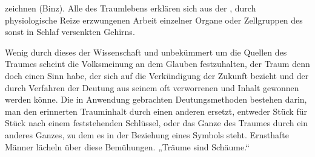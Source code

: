 \documentclass[twoside=true,titlepage=false,open=any, parskip=never, fontsize=10pt, headings=small, chapterprefix=false, appendixprefix=false]{scrbook}
\begin{document}
         
            
            
            
        \pstart
        zeichnen (Binz). Alle  des Traumlebens erklären sich aus der , durch physiologische Reize erzwungenen Arbeit einzelner Organe oder
               Zellgruppen des sonst in Schlaf versenkten Gehirns.
        \pend
    
            
        \pstart
        Wenig  durch dieses  der Wissenschaft und unbekümmert um die Quellen des Traumes  scheint die Volksmeinung an dem Glauben festzuhalten,  der Traum denn doch einen Sinn habe, der sich auf die Verkündigung der
               Zukunft bezieht  und der durch  Verfahren der Deutung aus seinem oft verworrenen und  Inhalt gewonnen werden könne. Die in Anwendung gebrachten
               Deutungsmethoden bestehen darin,  man den erinnerten Trauminhalt durch einen anderen ersetzt, entweder
               Stück für Stück nach einem feststehenden
                  Schlüssel, oder das Ganze des Traumes durch ein anderes Ganzes, zu dem
               es in der Beziehung eines Symbols steht.
               Ernsthafte Männer lächeln über diese Bemühungen. „Träume sind Schäume.“
        \pend
    
         
            
            
            \pstart[\section{II}]\pend
            
\end{document}
